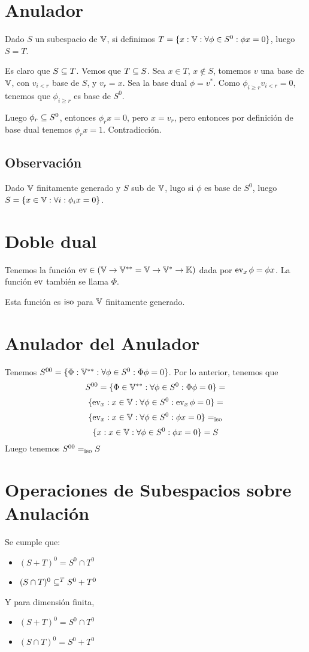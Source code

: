 \documentclass{article}
\begin{document}
\section*{Anulador}
Dado $S$ un subespacio de $\mathbb{V}$, si definimos
$T = \{x : \mathbb{V} : \forall \phi \in S^0 : \phi x = 0\}$, luego $S = T$.

Es claro que $S \subseteq T$. Vemos que $T \subseteq S$. Sea $x \in T$, $x \notin S$,
tomemos $v$ una base de $\mathbb{V}$, con $v_{i < r}$ base de $S$, y $v_r = x$. Sea
la base dual $\phi = v^*$. Como $\phi_{i \geq r}v_{i < r} = 0$, tenemos que
$\phi_{i \geq r}$ es base de $S^0$.

Luego $\phi_r \subseteq S^0$, entonces $\phi_r x = 0$, pero $x = v_r$, pero
entonces por definición de base dual tenemos $\phi_r x = 1$. Contradicción.

\subsection*{Observación}
Dado $\mathbb{V}$ finitamente generado y $S$ sub de $\mathbb{V}$, lugo si $\phi$ es base de
$S^0$, luego $S = \{x \in \mathbb{V} : \forall i : \phi_ix = 0\}$.

\section*{Doble dual}
Tenemos la función $\operatorname{ev} \in (\mathbb{V} \to \mathbb{V}^{**} = \mathbb{V} \to \mathbb{V}^{*} \to \mathbb{K})$
dada por $\operatorname{ev}_x \phi = \phi x$. La función $\operatorname{ev}$ también se llama $\Phi$.

Esta función es $\operatorname{iso}$ para $\mathbb{V}$ finitamente generado.

\section*{Anulador del Anulador}
Tenemos $S^{00} = \{\Phi : \mathbb{V}^{**} : \forall \phi \in S^0 : \Phi\phi = 0\}$.
Por lo anterior, tenemos que
\[
S^{00} = \{\Phi \in \mathbb{V}^{**} : \forall \phi \in S^0 : \Phi\phi = 0\} =
\]
\[
\{\operatorname{ev}_x : x \in \mathbb{V} : \forall \phi \in S^0 : \operatorname{ev}_x\phi = 0\} =
\]
\[
\{\operatorname{ev}_x : x \in \mathbb{V} : \forall \phi \in S^0 : \phi x = 0\} =_{\operatorname{iso}}
\]
\[
\{x : x \in \mathbb{V} : \forall \phi \in S^0 : \phi x = 0\} = S
\]
Luego tenemos $S^{00} =_{\operatorname{iso}} S$

\section*{Operaciones de Subespacios sobre Anulación}
Se cumple que:
\begin{itemize}
	\item $(S+T)^0 = S^0 \cap T^0$
	\item $(S\cap T)^0 \subseteq^T S^0 + T^0$
\end{itemize}
Y para dimensión finita,
\begin{itemize}
	\item $(S+T)^0 = S^0 \cap T^0$
	\item $(S\cap T)^0 = S^0 + T^0$
\end{itemize}
\end{document}
